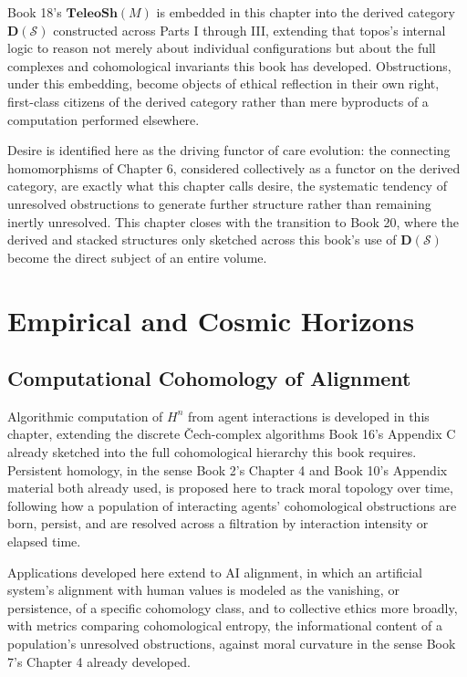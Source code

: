 Book 18's $\mathbf{TeleoSh}(M)$ is embedded in this chapter into the derived category $\mathbf{D}(\mathcal{S})$ constructed across Parts I through III, extending that topos's internal logic to reason not merely about individual configurations but about the full complexes and cohomological invariants this book has developed. Obstructions, under this embedding, become objects of ethical reflection in their own right, first-class citizens of the derived category rather than mere byproducts of a computation performed elsewhere.

Desire is identified here as the driving functor of care evolution: the connecting homomorphisms of Chapter 6, considered collectively as a functor on the derived category, are exactly what this chapter calls desire, the systematic tendency of unresolved obstructions to generate further structure rather than remaining inertly unresolved. This chapter closes with the transition to Book 20, where the derived and stacked structures only sketched across this book's use of $\mathbf{D}(\mathcal{S})$ become the direct subject of an entire volume.

\part{Empirical and Cosmic Horizons}

\chapter{Computational Cohomology of Alignment}

Algorithmic computation of $H^n$ from agent interactions is developed in this chapter, extending the discrete Čech-complex algorithms Book 16's Appendix C already sketched into the full cohomological hierarchy this book requires. Persistent homology, in the sense Book 2's Chapter 4 and Book 10's Appendix material both already used, is proposed here to track moral topology over time, following how a population of interacting agents' cohomological obstructions are born, persist, and are resolved across a filtration by interaction intensity or elapsed time.

Applications developed here extend to AI alignment, in which an artificial system's alignment with human values is modeled as the vanishing, or persistence, of a specific cohomology class, and to collective ethics more broadly, with metrics comparing cohomological entropy, the informational content of a population's unresolved obstructions, against moral curvature in the sense Book 7's Chapter 4 already developed.

